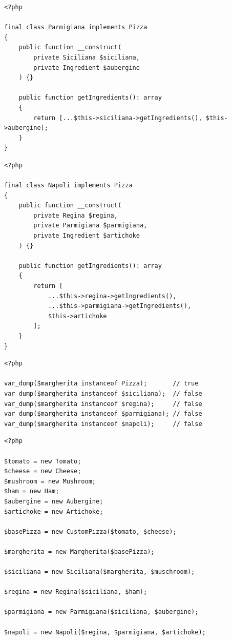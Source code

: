 \begin{frame}[fragile,c]
    \begin{lstlisting}
<?php

final class Parmigiana implements Pizza
{
    public function __construct(
        private Siciliana $siciliana,
        private Ingredient $aubergine
    ) {}

    public function getIngredients(): array
    {
        return [...$this->siciliana->getIngredients(), $this->aubergine];
    }
}
    \end{lstlisting}
\end{frame}

\begin{frame}[fragile,c]
    \begin{lstlisting}
<?php

final class Napoli implements Pizza
{
    public function __construct(
        private Regina $regina,
        private Parmigiana $parmigiana,
        private Ingredient $artichoke
    ) {}

    public function getIngredients(): array
    {
        return [
            ...$this->regina->getIngredients(),
            ...$this->parmigiana->getIngredients(),
            $this->artichoke
        ];
    }
}
    \end{lstlisting}
\end{frame}

\begin{frame}[fragile,c]
    \begin{lstlisting}
<?php

var_dump($margherita instanceof Pizza);       // true
var_dump($margherita instanceof $siciliana);  // false
var_dump($margherita instanceof $regina);     // false
var_dump($margherita instanceof $parmigiana); // false
var_dump($margherita instanceof $napoli);     // false
    \end{lstlisting}
\end{frame}

\begin{frame}[fragile,c]
    \begin{lstlisting}
<?php

$tomato = new Tomato;
$cheese = new Cheese;
$mushroom = new Mushroom;
$ham = new Ham;
$aubergine = new Aubergine;
$artichoke = new Artichoke;

$basePizza = new CustomPizza($tomato, $cheese);

$margherita = new Margherita($basePizza);

$siciliana = new Siciliana($margherita, $muschroom);

$regina = new Regina($siciliana, $ham);

$parmigiana = new Parmigiana($siciliana, $aubergine);

$napoli = new Napoli($regina, $parmigiana, $artichoke);
    \end{lstlisting}
\end{frame}


